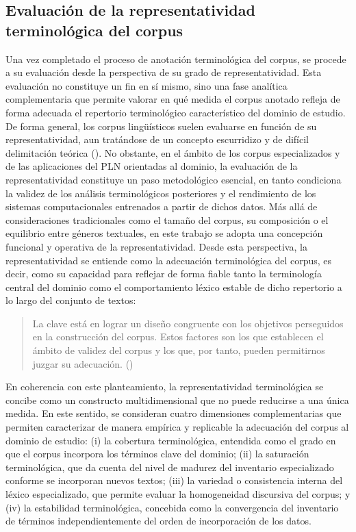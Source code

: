 \subsection{Evaluación de la representatividad terminológica del corpus} \label{evaluacion}

Una vez completado el proceso de anotación terminológica del corpus, se procede a su evaluación desde la perspectiva de su grado de representatividad. Esta evaluación no constituye un fin en sí mismo, sino una fase analítica complementaria que permite valorar en qué medida el corpus anotado refleja de forma adecuada el repertorio terminológico característico del dominio de estudio. De forma general, los corpus lingüísticos suelen evaluarse en función de su representatividad, aun tratándose de un concepto escurridizo y de difícil delimitación teórica (\cite{Egbert_Biber_Gray_2022}). No obstante, en el ámbito de los corpus especializados y de las aplicaciones del PLN orientadas al dominio, la evaluación de la representatividad constituye un paso metodológico esencial, en tanto condiciona la validez de los análisis terminológicos posteriores y el rendimiento de los sistemas computacionales entrenados a partir de dichos datos. Más allá de consideraciones tradicionales como el tamaño del corpus, su composición o el equilibrio entre géneros textuales, en este trabajo se adopta una concepción funcional y operativa de la representatividad. Desde esta perspectiva, la representatividad se entiende como la adecuación terminológica del corpus, es decir, como su capacidad para reflejar de forma fiable tanto la terminología central del dominio como el comportamiento léxico estable de dicho repertorio a lo largo del conjunto de textos:

\begin{quote}
    La clave está en lograr un diseño congruente con los objetivos perseguidos en la construcción del corpus. Estos factores son los que establecen el ámbito de validez del corpus y los que, por tanto, pueden permitirnos juzgar su adecuación. (\cite{rojo2021introduccion})
\end{quote}

En coherencia con este planteamiento, la representatividad terminológica se concibe como un constructo multidimensional que no puede reducirse a una única medida. En este sentido, se consideran cuatro dimensiones complementarias que permiten caracterizar de manera empírica y replicable la adecuación del corpus al dominio de estudio: (i) la cobertura terminológica, entendida como el grado en que el corpus incorpora los términos clave del dominio; (ii) la saturación terminológica, que da cuenta del nivel de madurez del inventario especializado conforme se incorporan nuevos textos; (iii) la variedad o consistencia interna del léxico especializado, que permite evaluar la homogeneidad discursiva del corpus; y (iv) la estabilidad terminológica, concebida como la convergencia del inventario de términos independientemente del orden de incorporación de los datos.

